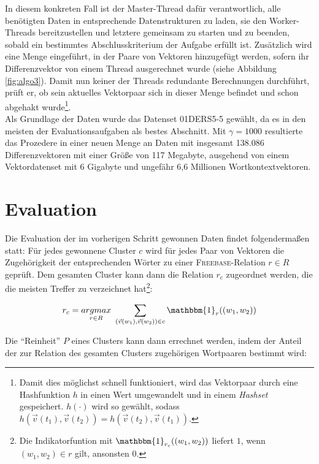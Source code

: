 In diesem konkreten Fall ist der Master-Thread dafür verantwortlich, alle benötigten Daten in entsprechende Datenstrukturen
zu laden, sie den Worker-Threads bereitzustellen und letztere gemeinsam zu starten und zu beenden, sobald ein bestimmtes
Abschlusskriterium der Aufgabe erfüllt ist.
Zusätzlich wird eine Menge eingeführt, in der Paare von Vektoren hinzugefügt werden, sofern
ihr Differenzvektor von einem Thread ausgerechnet wurde (siehe Abbildung \ref{fig:algo3}). Damit nun keiner der Threads redundante Berechnungen durchführt, prüft er, ob sein
aktuelles Vektorpaar sich in dieser Menge befindet und schon abgehakt wurde\footnote{Damit dies möglichst schnell funktioniert,
wird das Vektorpaar durch eine Hashfunktion $h$ in einen Wert umgewandelt und in einem \emph{Hashset} gespeichert. $h(\cdot)$ wird so gewählt,
sodass $h(\vec{v}(t_1), \vec{v}(t_2)) = h(\vec{v}(t_2), \vec{v}(t_1))$.}.\\

Als Grundlage der Daten wurde das Datenset 01DERS5-5 gewählt, da es in den meisten der Evaluationsaufgaben
als bestes Abschnitt. Mit $\gamma = 1000$ resultierte das Prozedere in einer neuen Menge an Daten mit insgesamt
138.086 Differenzvektoren mit einer Größe von 117 Megabyte, ausgehend von einem Vektordatenset mit 6 Gigabyte und
ungefähr 6,6 Millionen Wortkontextvektoren.\\

\section{Evaluation}

Die Evaluation der im vorherigen Schritt gewonnen Daten findet folgendermaßen statt: Für jedes gewonnene Cluster $c$ wird für
jedes Paar von Vektoren die Zugehörigkeit der entsprechenden Wörter zu einer \textsc{Freebase}-Relation $r \in R$ geprüft.
Dem gesamten Cluster kann dann die Relation $r_c$ zugeordnet werden, die die meisten Treffer zu verzeichnet hat\footnote{Die Indikatorfuntion mit $\mathbbm{1}_{r_c}((w_1, w_2))$ liefert $1$, wenn
$(w_1, w_2) \in r$ gilt, ansonsten $0$.}:

\begin{equation}
    r_c = \underset{r \in R}{argmax}\ \sum_{(\vec{v}(w_1), \vec{v}(w_2)) \in c}  \mathbbm{1}_{r}((w_1, w_2))
\end{equation}

Die ``Reinheit'' $P$ eines Clusters kann dann errechnet werden, indem der Anteil der zur Relation des gesamten Clusters
zugehörigen Wortpaaren bestimmt wird:

